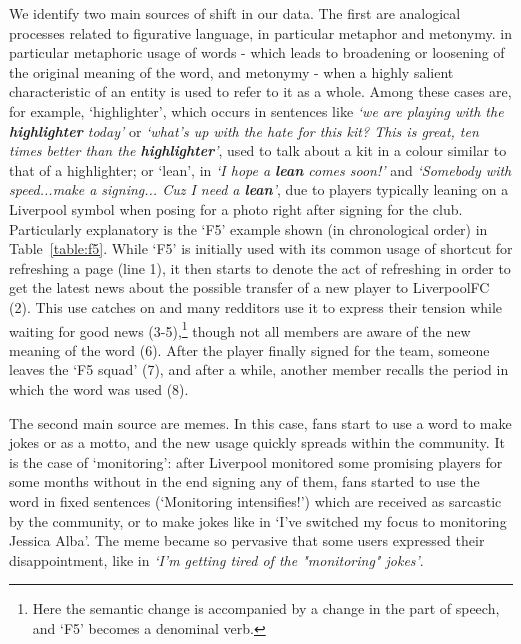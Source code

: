 
We identify two main sources of shift in our data.  The first are
analogical processes related to figurative language, in particular
metaphor and metonymy.
 in particular metaphoric usage of words - which leads to broadening or loosening of the original meaning of the word, and metonymy - when a highly salient characteristic of an entity is used to refer to it as a whole. Among these cases are, for example, `highlighter', which occurs in sentences like \textit{`we are playing with the \textbf{highlighter} today'} or \textit{`what's up with the hate for this kit? This is great, ten times better than the \textbf{highlighter}'}, used to talk about a kit in a colour similar to that of a highlighter; or `lean', in \textit{`I hope a \textbf{lean} comes soon!'} and \textit{`Somebody with speed...make a signing... Cuz I need a \textbf{lean}'}, due to players typically leaning on a Liverpool symbol when posing for a photo right after signing for the club. Particularly explanatory is the `F5' example shown (in chronological order) in
Table~\ref{table:f5}. While `F5' is initially used with its common usage of shortcut for refreshing a page (line 1), it then starts to denote the act of refreshing in order to get the latest news about the possible transfer of a new player to LiverpoolFC (2). This use catches on and many redditors use it to express their tension while waiting for good news (3-5),\footnote{Here the semantic change is accompanied by a change in the part of speech, and `F5' becomes a denominal verb.}
though not all members are aware of the new meaning of the word (6). After the player finally signed for the team, someone leaves the `F5 squad' (7), and after a while, another member recalls the period in which the word was used (8).

The second main source are memes. In this case, fans start to use a
word to make jokes or as a motto, and the new usage quickly spreads
within the community. It is the case of `monitoring': after Liverpool
monitored some promising players for some months without in the end
signing any of them, fans started to use the word in fixed sentences
(`Monitoring intensifies!') which are received as sarcastic by the
community, or to make jokes like in `I've switched my focus to
monitoring Jessica Alba'. The meme became so pervasive that some users expressed their disappointment, like in \textit{`I'm getting tired of the "monitoring" jokes'}. 

